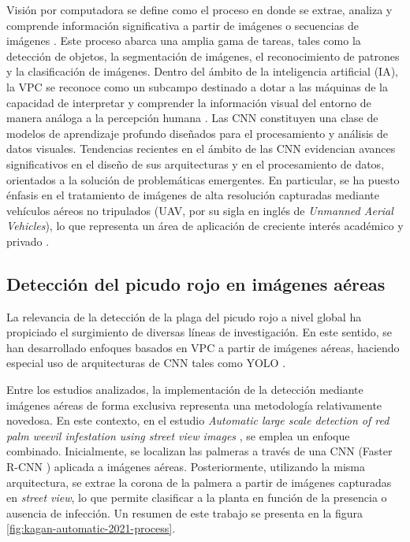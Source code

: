 Visión por computadora se define como el proceso en donde se extrae, analiza y comprende información significativa a partir de imágenes o secuencias de imágenes \citep{bmva_what_2017}. Este proceso abarca una amplia gama de tareas, tales como la detección de objetos, la segmentación de imágenes, el reconocimiento de patrones y la clasificación de imágenes. Dentro del ámbito de la inteligencia artificial (IA), la VPC se reconoce como un subcampo destinado a dotar a las máquinas de la capacidad de interpretar y comprender la información visual del entorno de manera análoga a la percepción humana \citep{torralba_foundations_2024}. Las CNN constituyen una clase de modelos de aprendizaje profundo diseñados para el procesamiento y análisis de datos visuales. Tendencias recientes en el ámbito de las CNN evidencian avances significativos en el diseño de sus arquitecturas y en el procesamiento de datos, orientados a la solución de problemáticas emergentes. En particular, se ha puesto énfasis en el tratamiento de imágenes de alta resolución capturadas mediante vehículos aéreos no tripulados (UAV, por su sigla en inglés de \textit{Unmanned Aerial Vehicles}), lo que representa un área de aplicación de creciente interés académico y privado \citep{gao_recent_2024} \citep{sutar_convolutional_2025}.

\subsection{Detección del picudo rojo en imágenes aéreas}

La relevancia de la detección de la plaga del picudo rojo a nivel global ha propiciado el surgimiento de diversas líneas de investigación. En este sentido, se han desarrollado enfoques basados en VPC a partir de imágenes aéreas, haciendo especial uso de arquitecturas de CNN tales como YOLO \citep{redmon_you_2016}.

Entre los estudios analizados, la implementación de la detección mediante imágenes aéreas de forma exclusiva representa una metodología relativamente novedosa. En este contexto, en el estudio \textit{Automatic large scale detection of red palm weevil infestation using street view images} \citep{kagan_automatic_2021}, se emplea un enfoque combinado. Inicialmente, se localizan las palmeras a través de una CNN (Faster R-CNN \citep{ren_faster_2016}) aplicada a imágenes aéreas. Posteriormente, utilizando la misma arquitectura, se extrae la corona de la palmera a partir de imágenes capturadas en \textit{street view}, lo que permite clasificar a la planta en función de la presencia o ausencia de infección. Un resumen de este trabajo se presenta en la figura \ref{fig:kagan-automatic-2021-process}.

